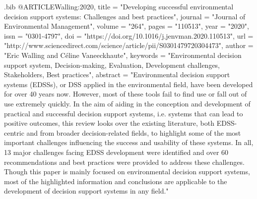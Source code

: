 \begin{filecontents}{\jobname.bib}
@ARTICLE{Walling:2020,
  title = "Developing successful environmental decision support systems: Challenges and best practices",
  journal = "Journal of Environmental Management",
  volume = "264",
  pages = "110513",
  year = "2020",
  issn = "0301-4797",
  doi = "https://doi.org/10.1016/j.jenvman.2020.110513",
  url = "http://www.sciencedirect.com/science/article/pii/S0301479720304473",
  author = "Eric Walling and Céline Vaneeckhaute",
  keywords = "Environmental decision support system, Decision-making, Evaluation, Development challenges, Stakeholders, Best practices",
  abstract = "Environmental decision support systems (EDSSs), or DSS applied in the environmental field, have been developed for over 40 years now. However, most of these tools fail to find use or fall out of use extremely quickly. In the aim of aiding in the conception and development of practical and successful decision support systems, i.e. systems that can lead to positive outcomes, this review looks over the existing literature, both EDSS-centric and from broader decision-related fields, to highlight some of the most important challenges influencing the success and usability of these systems. In all, 13 major challenges facing EDSS development were identified and over 60 recommendations and best practices were provided to address these challenges. Though this paper is mainly focused on environmental decision support systems, most of the highlighted information and conclusions are applicable to the development of decision support systems in any field."
}


\end{filecontents}
